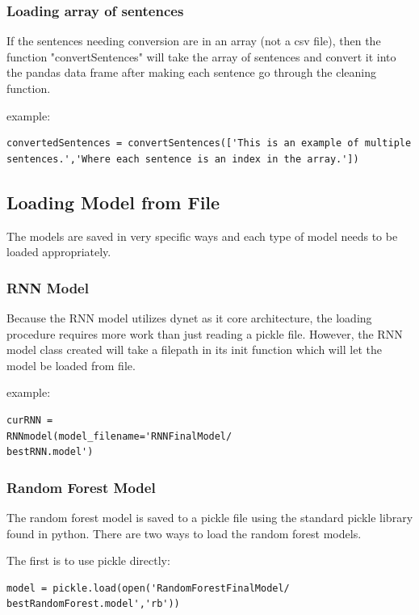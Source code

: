 \documentclass[twoside,twocolumn]{article}
\begin{document}
\subsubsection{Loading array of sentences}

If the sentences needing conversion are in an array (not a csv file), then the function "convertSentences" will take the array of sentences and convert it into
the pandas data frame after making each sentence go through the cleaning function.

example:
\begin{lstlisting}
convertedSentences = convertSentences(['This is an example of multiple sentences.','Where each sentence is an index in the array.'])
\end{lstlisting}
\subsection{Loading Model from File}

The models are saved in very specific ways and each type of model needs to be loaded appropriately.

\subsubsection{RNN Model}

Because the RNN model utilizes dynet as it core architecture, the loading procedure requires more work than just reading a pickle file.
However, the RNN model class created will take a filepath in its init function which will let the model be loaded from file.

example:
\begin{lstlisting}
curRNN = 
RNNmodel(model_filename='RNNFinalModel/
bestRNN.model')
\end{lstlisting}

\subsubsection{Random Forest Model}

The random forest model is saved to a pickle file using the standard pickle library found in python.
There are two ways to load the random forest models.

The first is to use pickle directly:
\begin{lstlisting}
model = pickle.load(open('RandomForestFinalModel/
bestRandomForest.model','rb'))
\end{lstlisting}
\end{document}
